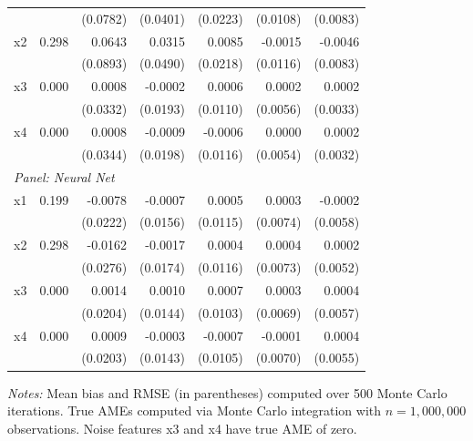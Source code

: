\begin{table}[htbp]
\begin{threeparttable}
\begin{tabular}{lrrrrrr}
 &  & (0.0782) & (0.0401) & (0.0223) & (0.0108) & (0.0083) \\
\quad x2 & 0.298 & 0.0643 & 0.0315 & 0.0085 & -0.0015 & -0.0046 \\
 &  & (0.0893) & (0.0490) & (0.0218) & (0.0116) & (0.0083) \\
\quad x3 & 0.000 & 0.0008 & -0.0002 & 0.0006 & 0.0002 & 0.0002 \\
 &  & (0.0332) & (0.0193) & (0.0110) & (0.0056) & (0.0033) \\
\quad x4 & 0.000 & 0.0008 & -0.0009 & -0.0006 & 0.0000 & 0.0002 \\
 &  & (0.0344) & (0.0198) & (0.0116) & (0.0054) & (0.0032) \\
\midrule
\multicolumn{7}{l}{\textit{Panel: Neural Net}} \\
\quad x1 & 0.199 & -0.0078 & -0.0007 & 0.0005 & 0.0003 & -0.0002 \\
 &  & (0.0222) & (0.0156) & (0.0115) & (0.0074) & (0.0058) \\
\quad x2 & 0.298 & -0.0162 & -0.0017 & 0.0004 & 0.0004 & 0.0002 \\
 &  & (0.0276) & (0.0174) & (0.0116) & (0.0073) & (0.0052) \\
\quad x3 & 0.000 & 0.0014 & 0.0010 & 0.0007 & 0.0003 & 0.0004 \\
 &  & (0.0204) & (0.0144) & (0.0103) & (0.0069) & (0.0057) \\
\quad x4 & 0.000 & 0.0009 & -0.0003 & -0.0007 & -0.0001 & 0.0004 \\
 &  & (0.0203) & (0.0143) & (0.0105) & (0.0070) & (0.0055) \\
\bottomrule
\end{tabular}
\begin{tablenotes}
\footnotesize
\item \textit{Notes:} Mean bias and RMSE (in parentheses) computed over 500 Monte Carlo iterations. True AMEs computed via Monte Carlo integration with $n=1{,}000{,}000$ observations. Noise features x3 and x4 have true AME of zero.
\end{tablenotes}
\end{threeparttable}
\end{table}